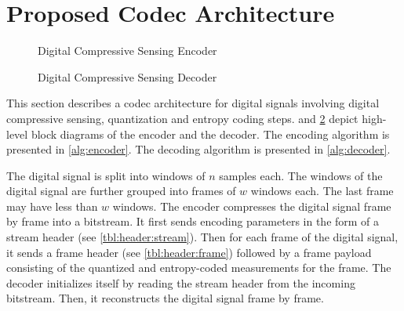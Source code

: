 \section{Proposed Codec Architecture}
\label{sec:arch}
\begin{figure}[!ht]
\centering 

\caption{Digital Compressive Sensing Encoder}
\label{fig-cs-encoder}
\end{figure}

\begin{figure}[!ht]
\centering 

\caption{Digital Compressive Sensing Decoder}
\label{fig-cs-decoder}
\end{figure}
This section describes a codec architecture
for digital signals involving digital
compressive sensing, quantization and entropy
coding steps.
and \cref{fig-cs-decoder}
depict high-level block diagrams of the encoder
and the decoder.
The encoding algorithm is presented in
\cref{alg:encoder}.
The decoding algorithm is presented in
\cref{alg:decoder}.

\begin{figure}[!t]
 \removelatexerror
 \centering

\end{figure}

\begin{figure}[!t]
 \removelatexerror
 \centering

\end{figure}

The digital signal is split into windows
of $n$ samples each. The windows of
the digital signal are further grouped into
frames of $w$ windows each. The
last frame may have less than $w$
windows.
The encoder compresses the digital signal
frame by frame into a bitstream.
It first sends
encoding parameters in the form
of a stream header (see \cref{tbl:header:stream}).
Then for each frame of the digital signal,
it sends a frame header (see \cref{tbl:header:frame})
followed by a frame payload consisting of the
quantized and entropy-coded measurements for the frame.
The decoder initializes itself by reading
the stream header from the incoming bitstream. 
Then, it reconstructs the digital signal
frame by frame.






